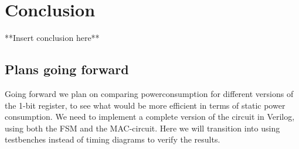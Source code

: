 \section{Conclusion}
\label{sec:conclution}

**Insert conclusion here**



\subsection{Plans going forward}

Going forward we plan on comparing powerconsumption for different versions of the 1-bit register, to see what would be more efficient in terms of static power consumption. We need to implement a complete version of the circuit in Verilog, using both the FSM and the MAC-circuit. Here we will transition into using testbenches instead of timing diagrams to verify the results.